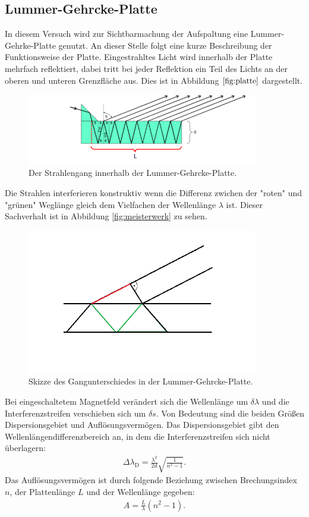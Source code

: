 \subsection{Lummer-Gehrcke-Platte}
In diesem Versuch wird zur Sichtbarmachung der Aufspaltung eine Lummer-Gehrke-Platte genutzt.
An dieser Stelle folgt eine kurze Beschreibung der Funktionsweise der Platte.
Eingestrahltes Licht wird innerhalb der Platte mehrfach reflektiert, dabei tritt bei
jeder Reflektion ein Teil des Lichts an der oberen und unteren Grenzfläche aus.
Dies ist in Abbildung $\ref{fig:platte}$ dargestellt.
\begin{figure}
   \centering
    \includegraphics[width=0.9\textwidth]{platte.PNG}
    \caption{Der Strahlengang innerhalb der Lummer-Gehrcke-Platte.\cite{skript}}
    \label{fig:platte}
\end{figure}
Die Strahlen interferieren konstruktiv wenn die Differenz zwichen der "roten" und "grünen"
Weglänge gleich dem Vielfachen der Wellenlänge $\lambda$ ist. Dieser Sachverhalt ist in
Abbildung \ref{fig:meisterwerk} zu sehen.
\begin{figure}
   \centering
    \includegraphics[width=0.9\textwidth]{meisterwerk.PNG}
    \caption{Skizze des Gangunterschiedes in der Lummer-Gehrcke-Platte.\cite{skript}}
    \label{fig:platte}
\end{figure}
\FloatBarrier
Bei eingeschaltetem Magnetfeld verändert sich die Wellenlänge um $\delta\lambda$ und
die Interferenzstreifen verschieben sich um $\delta s$.
Von Bedeutung sind die beiden Größen Dispersionsgebiet und Auflösungsvermögen.
Das Dispersionsgebiet gibt den Wellenlängendifferenzbereich an, in dem die
Interferenzstreifen sich nicht überlagern:
\begin{align}
  \Delta\lambda_\mathrm{D}=\frac{\lambda^2}{2d}\sqrt{\frac{1}{n^2-1}} \label{eqn:dispersionsgebiet}.
\end{align}
Das Auflösungsvermögen ist durch folgende Beziehung zwischen Brechungsindex $n$,
der Plattenlänge $L$ und der Wellenlänge gegeben:
\begin{align}
  A=\frac{L}{\lambda}(n^2-1)\label{eqn:aufloesung}.
\end{align}
